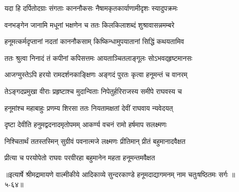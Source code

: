 \twolineshloka
{यदा हि दर्पितोदग्राः संगताः काननौकसः}
{नैषामकृतकार्याणामीदृशः स्यादुपक्रमः} %

\twolineshloka
{वनभङ्गेन जानामि मधूनां भक्षणेन च}
{ततः किलकिलाशब्दं शुश्रावासन्नमम्बरे} %

\twolineshloka
{हनूमत्कर्मदृप्तानां नदतां काननौकसाम्}
{किष्किन्धामुपयातानां सिद्धिं कथयतामिव} %

\twolineshloka
{ततः श्रुत्वा निनादं तं कपीनां कपिसत्तमः}
{आयताञ्चितलाङ्गूलः सोऽभवद्हृष्टमानसः} %

\twolineshloka
{आजग्मुस्तेऽपि हरयो रामदर्शनकाङ्क्षिणः}
{अङ्गदं पुरतः कृत्वा हनूमन्तं च वानरम्} %

\twolineshloka
{तेऽङ्गदप्रमुखा वीराः प्रहृष्टाश्च मुदान्विताः}
{निपेतुर्हरिराजस्य समीपे राघवस्य च} %

\twolineshloka
{हनूमांश्च महाबाहुः प्रणम्य शिरसा ततः}
{नियतामक्षतां देवीं राघवाय न्यवेदयत्} %

\twolineshloka
{दृष्टा देवीति हनुमद्वदनादमृतोपमम्}
{आकर्ण्य वचनं रामो हर्षमाप सलक्ष्मणः} %

\twolineshloka
{निश्चितार्थं ततस्तस्मिन् सुग्रीवं पवनात्मजे}
{लक्ष्मणः प्रीतिमान् प्रीतं बहुमानादवैक्षत} %

\twolineshloka
{प्रीत्या च परयोपेतो राघवः परवीरहा}
{बहुमानेन महता हनूमन्तमवैक्षत} %


॥इत्यार्षे श्रीमद्रामायणे वाल्मीकीये आदिकाव्ये सुन्दरकाण्डे हनूमदाद्यागमनम् नाम चतुःषष्ठितमः सर्गः ॥५-६४॥
